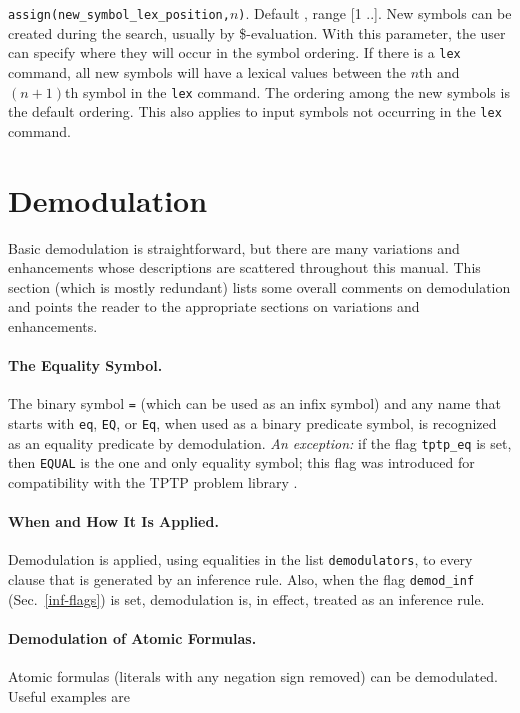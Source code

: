 \documentclass[11pt]{article}
\begin{document}
\noindent
\verb:assign(new_symbol_lex_position,:$n$\verb:):.  Default \maxint, range [1 ..\maxint ].
New symbols can be created during the search, usually by \$-evaluation.
With this parameter, the user can specify where
they will occur in the symbol ordering.  If there is a \verb:lex: command,
all new symbols will have a lexical values between the $n$th and
$(n+1)$th symbol in the \verb:lex: command.  The ordering among the new
symbols is the default ordering.  This also applies to input
symbols not occurring in the \verb:lex: command.

\section{Demodulation}

Basic demodulation is straightforward, but there are many variations
and enhancements whose descriptions are scattered throughout this
manual.  This section (which is mostly redundant) lists some overall
comments on demodulation and points the reader to the appropriate
sections on variations and enhancements.

\paragraph{The Equality Symbol.}
The binary symbol \verb:=: (which can be used as an infix symbol) and
any name that starts with \verb:eq:, \verb:EQ:, or \verb:Eq:, when
used as a binary predicate symbol, is recognized as an equality
predicate by demodulation.  \emph{An exception:} if the flag
\verb:tptp_eq: is set, then \verb:EQUAL: is the one and only
equality symbol; this flag was introduced for compatibility
with the TPTP problem library \cite{tptp-web}.

\paragraph{When and How It Is Applied.}
Demodulation is applied, using equalities in the list \verb:demodulators:,
to every clause that is generated by an inference rule.
Also, when the flag \verb:demod_inf: (Sec.~\ref{inf-flags})
is set, demodulation is, in effect, treated as an inference rule.

\paragraph{Demodulation of Atomic Formulas.}  Atomic formulas (literals with any
negation sign removed) can be demodulated.  Useful examples are
\end{document}
